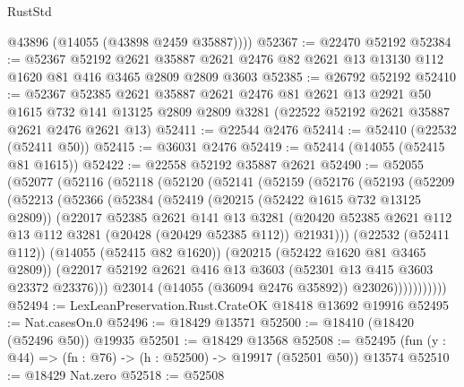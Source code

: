 \begin{lexlean}{RustStd}
\begin{coremodule}
        @43896
        (@14055 (@43898 @2459 @35887))))
@52367 := @22470 @52192
@52384 := @52367
    @52192
    @2621
    @35887
    @2621
    @2476
    @82
    @2621
    @13
    @13130
    @112
    @1620
    @81
    @416
    @3465
    @2809
    @2809
    @3603
@52385 := @26792 @52192
@52410 := @52367
    @52385
    @2621
    @35887
    @2621
    @2476
    @81
    @2621
    @13
    @2921
    @50
    @1615
    @732
    @141
    @13125
    @2809
    @2809
    @3281
    (@22522 @52192 @2621 @35887 @2621 @2476 @2621 @13)
@52411 := @22544 @2476
@52414 := @52410 (@22532 (@52411 @50))
@52415 := @36031 @2476
@52419 := @52414 (@14055 (@52415 @81 @1615))
@52422 := @22558 @52192 @35887 @2621
@52490 := @52055
    (@52077
      (@52116
        (@52118
          (@52120
            (@52141
              (@52159
                (@52176
                  (@52193
                    (@52209
                      (@52213
                        (@52366
                          (@52384
                            (@52419
                              (@20215 (@52422 @1615 @732 @13125 @2809))
                              (@22017
                                @52385
                                @2621
                                @141
                                @13
                                @3281
                                (@20420
                                  @52385
                                  @2621
                                  @112
                                  @13
                                  @112
                                  @3281
                                  (@20428 (@20429 @52385 @112))
                                  @21931)))
                            (@22532 (@52411 @112))
                            (@14055 (@52415 @82 @1620))
                            (@20215 (@52422 @1620 @81 @3465 @2809))
                            (@22017
                              @52192
                              @2621
                              @416
                              @13
                              @3603
                              (@52301 @13 @415 @3603 @23372 @23376)))
                          @23014
                          (@14055 (@36094 @2476 @35892))
                          @23026)))))))))))
@52494 := LexLeanPreservation.Rust.CrateOK @18418 @13692 @19916
@52495 := Nat.casesOn.{0}
@52496 := @18429 @13571
@52500 := @18410 (@18420 (@52496 @50)) @19935
@52501 := @18429 @13568
@52508 := @52495 (fun (y : @44) => (fn : @76) -> (h : @52500) -> @19917 (@52501 @50)) @13574
@52510 := @18429 Nat.zero
@52518 := @52508

\end{coremodule}
\end{lexlean}
